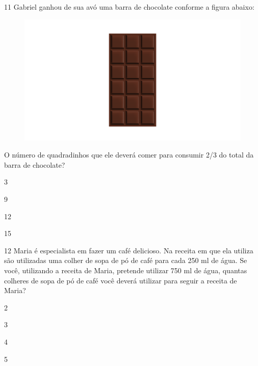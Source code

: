 \num{11} Gabriel ganhou de sua avó uma barra de chocolate conforme a figura
abaixo:

\begin{figure}[htpb!]
\includegraphics[width=\textwidth]{../ilustracoes/MAT5/SAEB_5ANO_MAT_figura120.png}
\end{figure}

O número de quadradinhos que ele deverá comer para consumir 2/3 do total
da barra de chocolate?

\begin{escolha}
\item
  3
\item
  9
\item
  12
\item
  15
\end{escolha}


\num{12} Maria é especialista em fazer um café delicioso. Na receita em que
ela utiliza são utilizadas uma colher de sopa de pó de café para cada
250 ml de água. Se você, utilizando a receita de Maria, pretende
utilizar 750 ml de água, quantas colheres de sopa de pó de café você
deverá utilizar para seguir a receita de Maria?

\begin{escolha}
\item
  2
\item
  3
\item
  4
\item
  5
\end{escolha}

